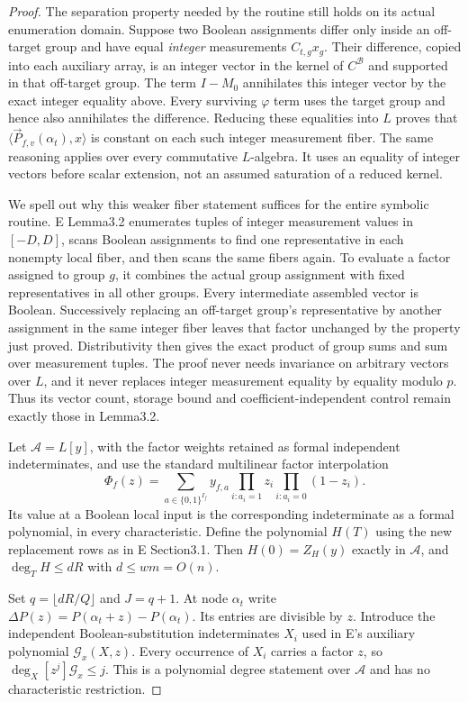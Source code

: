 \begin{proof}
The separation property needed by the routine still holds on its actual enumeration domain. Suppose two Boolean assignments differ only inside an off-target group and have equal \emph{integer} measurements $C_{t,g}x_g$. Their difference, copied into each auxiliary array, is an integer vector in the kernel of $C^{\mathcal B}$ and supported in that off-target group. The term $I-M_0$ annihilates this integer vector by the exact integer equality above. Every surviving $\varphi$ term uses the target group and hence also annihilates the difference. Reducing these equalities into $L$ proves that $\langle\vec P_{f,v}(\alpha_t),x\rangle$ is constant on each such integer measurement fiber. The same reasoning applies over every commutative $L$-algebra. It uses an equality of integer vectors before scalar extension, not an assumed saturation of a reduced kernel.

We spell out why this weaker fiber statement suffices for the entire symbolic routine. E Lemma3.2 enumerates tuples of integer measurement values in $[-D,D]$, scans Boolean assignments to find one representative in each nonempty local fiber, and then scans the same fibers again. To evaluate a factor assigned to group $g$, it combines the actual group assignment with fixed representatives in all other groups. Every intermediate assembled vector is Boolean. Successively replacing an off-target group's representative by another assignment in the same integer fiber leaves that factor unchanged by the property just proved. Distributivity then gives the exact product of group sums and sum over measurement tuples. The proof never needs invariance on arbitrary vectors over $L$, and it never replaces integer measurement equality by equality modulo $p$. Thus its vector count, storage bound and coefficient-independent control remain exactly those in Lemma3.2.

Let $\mathcal A=L[y]$, with the factor weights retained as formal independent indeterminates, and use the standard multilinear factor interpolation
\[
 \Phi_f(z)=\sum_{a\in\{0,1\}^{I_f}}y_{f,a}
            \prod_{i:a_i=1}z_i\prod_{i:a_i=0}(1-z_i).
\]
Its value at a Boolean local input is the corresponding indeterminate as a formal polynomial, in every characteristic. Define the polynomial $H(T)$ using the new replacement rows as in E Section3.1. Then $H(0)=Z_H(y)$ exactly in $\mathcal A$, and $\deg_T H\leq dR$ with $d\leq wm=O(n)$.

Set $q=\lfloor dR/Q\rfloor$ and $J=q+1$. At node $\alpha_t$ write
$\Delta P(z)=P(\alpha_t+z)-P(\alpha_t)$. Its entries are divisible by $z$. Introduce the independent Boolean-substitution indeterminates $X_i$ used in E's auxiliary polynomial $\mathcal G_x(X,z)$. Every occurrence of $X_i$ carries a factor $z$, so $\deg_X[z^j]\mathcal G_x\leq j$. This is a polynomial degree statement over $\mathcal A$ and has no characteristic restriction.


\end{proof}
